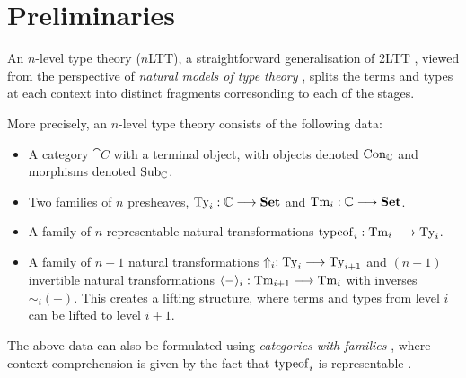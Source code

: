 \section{Preliminaries}\label{sec:prelim}

An $n$-level type theory ($n$LTT), a straightforward generalisation of 2LTT
\cite{Kovacs2022-vb}, viewed from the perspective of \emph{natural models of
  type theory} \cite{Awodey2014-hh}, splits the terms and types at each context
into distinct fragments corresonding to each of the stages.

More precisely, an $n$-level type theory consists of the following data:
\begin{itemize}
  \item A category $\cat{C}$ with a terminal object, with objects denoted
        $\mathrm{Con}_\mathbb{C}$ and morphisms denoted $\mathrm{Sub}_\mathbb{C}$.
  \item Two families of $n$ presheaves, $\mathrm{Ty}_i : \mathbb{C} \longrightarrow \mathbf{Set}$ and $\mathrm{Tm}_i :
          \mathbb{C} \longrightarrow \mathbf{Set}$.
  \item A family of $n$ representable natural transformations $\mathrm{typeof}_i : \mathrm{Tm}_i \longrightarrow
          \mathrm{Ty}_i$.
  \item A family of $n-1$ natural transformations $\Uparrow_i : \mathrm{Ty}_i \longrightarrow \mathrm{Ty}_{i + 1}$
        and $(n-1)$ invertible natural transformations $\langle-\rangle_i : \mathrm{Tm}_{i + 1}
          \longrightarrow \mathrm{Tm}_i$ with inverses $\sim_i(-)$. This creates a lifting structure, where
        terms and types from level $i$ can be lifted to level $i + 1$.
\end{itemize}

The above data can also be formulated using \emph{categories with families}
\cite{Castellan2019-sh}, where context comprehension is given by the fact that
$\mathrm{typeof}_i$ is representable \cite{Uemura2019-cc}.

